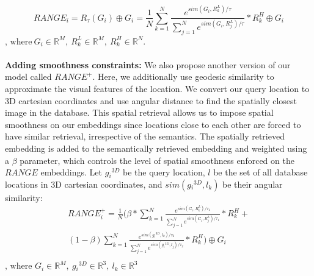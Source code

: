 \begin{equation}
    RANGE_i = R_{\tau}(G_i) \oplus G_i 
= \frac{1}{N}\sum_{k=1}^{N}{\frac{e^{sim(G_i,R_{k}^L)/\tau}}
{\sum_{j=1}^{N}{e^{sim(G_i,R_{j}^L)/\tau}}}} * R_{k}^H \oplus G_i
\end{equation}
\noindent $\text{, where}\ G_i\in \mathbb{R}^M,\ R_{k}^L \in \mathbb{R}^M,\ R_{k}^H \in \mathbb{R}^{N}.$
%
\\
\\
\noindent \textbf{Adding smoothness constraints: }We also propose another version of our model called $RANGE^+$. Here, we additionally use geodesic similarity to approximate the visual features of the location. We convert our query location to 3D cartesian coordinates and use angular distance to find the spatially closest image in the database. This spatial retrieval allows us to impose spatial smoothness on our embeddings since locations close to each other are forced to have similar retrieval, irrespective of the semantics.  The spatially retrieved embedding is added to the semantically retrieved embedding and weighted using a $\beta$ parameter, which controls the level of spatial smoothness enforced on the $RANGE$ embeddings. Let $g{_i}^{3D}$ be the query location, $l$ be the set of all database locations in 3D cartesian coordinates, and $sim(g{_i}^{3D}, l_k)$ be their angular similarity:   
\begin{multline}
\label{eq:rangep}
RANGE^+_{i} = \frac{1}{N}(\beta*\sum_{k=1}^{N}{\frac{e^{sim(G_i,R_{k}^L)/\tau_{1}}}{\sum_{j=1}^{N}{e^{sim(G_i,R_{j}^L)/\tau_{1}}}}} * R_{k}^H+ \\ 
     (1-\beta)\sum_{k=1}^{N}{\frac{e^{sim(g{_i}^{3D},l_{k})/\tau_{2}}}{\sum_{j=1}^{N}{e^{sim(g{_i}^{3D},l_{j})/\tau_{2}}}}} * R_{k}^H
     )\oplus G_i \\
\end{multline}
$\text{, where } G_i \in \mathbb{R}^M, \ g{_i}^{3D} \in \mathbb{R}^3, \ l_k \in \mathbb{R}^3$
